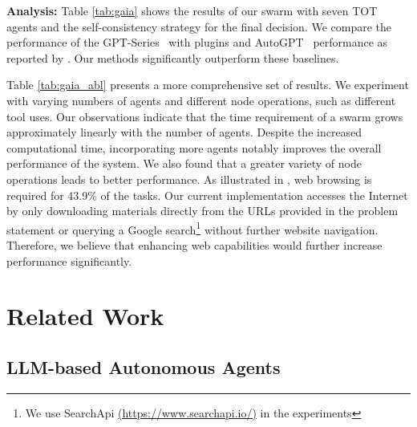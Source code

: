\documentclass{article}
\theoremstyle{plain}
\theoremstyle{definition}
\theoremstyle{remark}
\begin{document}
\noindent \textbf{Analysis:} 
Table \ref{tab:gaia} shows the results of our swarm with seven TOT agents and the self-consistency strategy for the final decision.
We compare the performance of the GPT-Series~\citep{achiam2023gpt} with plugins and AutoGPT~\citep{autogpt_github} performance as reported by \citet{mialon2023gaia}. 
Our methods significantly outperform these baselines.

Table \ref{tab:gaia_abl} presents a more comprehensive set of results.
We experiment with varying numbers of agents and different node operations, such as different tool uses.
Our observations indicate that the time requirement of a swarm grows approximately linearly with the number of agents. 
Despite the increased computational time, incorporating more agents notably improves the overall performance of the system.
We also found that a greater variety of node operations leads to better performance. 
As illustrated in , web browsing is required for 43.9\% of the tasks.
Our current implementation accesses the Internet by only downloading materials directly from the URLs provided in the problem statement or querying a Google search\footnote{We use SearchApi \href{https://www.searchapi.io/}{(https://www.searchapi.io/)} in the experiments} without further website navigation.
Therefore, we believe that enhancing web capabilities would further increase performance significantly.


\section{Related Work}

\subsection{LLM-based Autonomous Agents}
\end{document}
